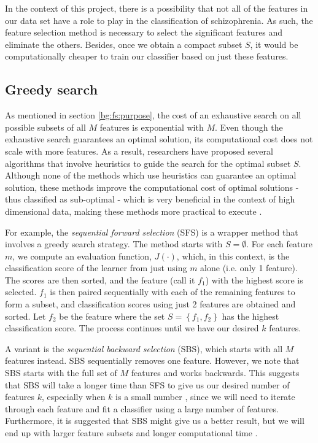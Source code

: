 \documentclass[12pt, twoside, a4paper]{report}
\begin{document}
In the context of this project, there is a possibility that not all of the features in our data set have a role to play in the classification of schizophrenia. As such, the feature selection method is necessary to select the significant features and eliminate the others. Besides, once we obtain a compact subset $S$, it would be computationally cheaper to train our classifier based on just these features.


\subsection{Greedy search} \label{bg:fs:greedy}
As mentioned in section \ref{bg:fs:purpose}, the cost of an exhaustive search on all possible subsets of all $M$ features is exponential with $M$. Even though the exhaustive search guarantees an optimal solution, its computational cost does not scale with more features. As a result, researchers have proposed several algorithms that involve heuristics to guide the search for the optimal subset $S$. Although none of the methods which use heuristics can guarantee an optimal solution, these methods improve the computational cost of optimal solutions - thus classified as sub-optimal - which is very beneficial in the context of high dimensional data, making these methods more practical to execute \cite{RefWorks:140, RefWorks:182}.

For example, the \textit{sequential forward selection} (SFS) \cite{RefWorks:177} is a wrapper method that involves a greedy search strategy. The method starts with $S=\emptyset$. For each feature $m$, we compute an evaluation function, $J(\cdot)$, which, in this context, is the classification score of the learner from just using $m$ alone (i.e. only 1 feature). The scores are then sorted, and the feature (call it $f_1$) with the highest score is selected. $f_1$ is then paired sequentially with each of the remaining features to form a subset, and classification scores using just 2 features are obtained and sorted. Let $f_2$ be the feature where the set $S= \left\lbrace f_1, f_2 \right\rbrace$ has the highest classification score. The process continues until we have our desired $k$ features.
  
A variant is the \textit{sequential backward selection} (SBS), which starts with all $M$ features instead. SBS sequentially removes one feature. However, we note that SBS starts with the full set of $M$ features and works backwards. This suggests that SBS will take a longer time than SFS to give us our desired number of features $k$, especially when $k$ is a small number \cite{RefWorks:190}, since we will need to iterate through each feature and fit a classifier using a large number of features. Furthermore, it is suggested that SBS might give us a better result, but we will end up with larger feature subsets and longer computational time \cite{RefWorks:208}.
\end{document}
